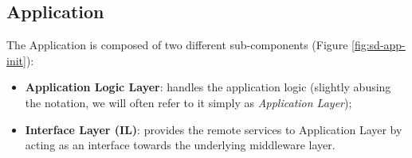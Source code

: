 \subsection{Application}
The Application is composed of two different sub-components (Figure
\ref{fig:sd-app-init}):

\begin{itemize}
  \item \textbf{Application Logic Layer}: handles the application logic
    (slightly abusing the notation, we will often refer to it simply as
    \textit{Application Layer});
  \item \textbf{Interface Layer (IL)}: provides the remote services to Application
    Layer by acting as an interface towards the underlying middleware layer.
\end{itemize}








